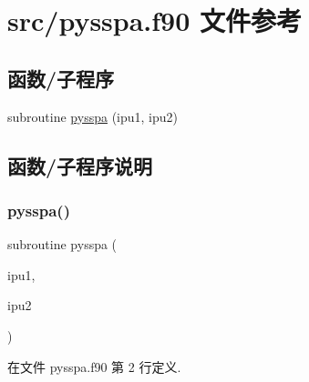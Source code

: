 \hypertarget{pysspa_8f90}{}\section{src/pysspa.f90 文件参考}
\label{pysspa_8f90}
\subsection*{函数/子程序}
\begin{DoxyCompactItemize}
\item 
subroutine \mbox{\hyperlink{pysspa_8f90_acaf3967cc9cce1e72b770b7675891ed5}{pysspa}} (ipu1, ipu2)
\end{DoxyCompactItemize}


\subsection{函数/子程序说明}
\mbox{\label{pysspa_8f90_acaf3967cc9cce1e72b770b7675891ed5}} 
\subsubsection{\texorpdfstring{pysspa()}{pysspa()}}
{\footnotesize\ttfamily subroutine pysspa (\begin{DoxyParamCaption}\item[{}]{ipu1,  }\item[{}]{ipu2 }\end{DoxyParamCaption})}



在文件 pysspa.\+f90 第 2 行定义.

